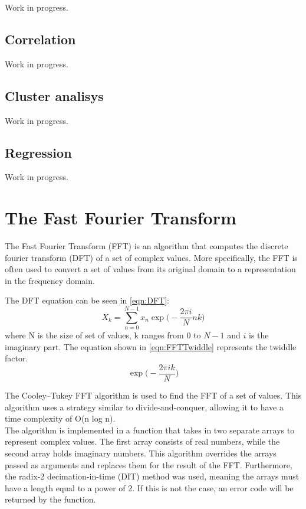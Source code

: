 \documentclass{book}
\begin{document}
Work in progress.
\subsection{Correlation}

Work in progress.
\subsection{Cluster analisys}

Work in progress.
\subsection{Regression}

Work in progress.

\section{The Fast Fourier Transform}


The Fast Fourier Transform (FFT) is an algorithm that computes the discrete fourier transform (DFT) of a set of complex values. More specifically, the FFT is often used to convert a set of values from its original domain to a representation in the frequency domain.

The DFT equation can be seen in \ref{eqn:DFT}:
\begin{equation}
	X_k = \sum_{n=0}^{N-1} x_n \exp \biggl(- \frac{2 \pi i}{N} nk \biggr)
	\label{eqn:DFT}
\end{equation}
where N is the size of set of values, k ranges from 0 to $N-1$ and $i$ is the imaginary part. The equation shown in \ref{eqn:FFTTwiddle} represents the twiddle factor.
\begin{equation}
	\exp \biggl( - \frac{2 \pi i k}{N} \biggr)
	\label{eqn:FFTTwiddle}
\end{equation}

The Cooley–Tukey FFT algorithm is used to find the FFT of a set of values. This algorithm uses a strategy similar to divide-and-conquer, allowing it to have a time complexity of O(n log n). \\

The algorithm is implemented in a function that takes in two separate arrays to represent complex values. The first array consists of real numbers, while the second array holds imaginary numbers. This algorithm overrides the arrays passed as arguments and replaces them for the result of the FFT. Furthermore, the radix-2 decimation-in-time (DIT) method was used, meaning the arrays must have a length equal to a power of 2. If this is not the case, an error code will be returned by the function. 
\end{document}
